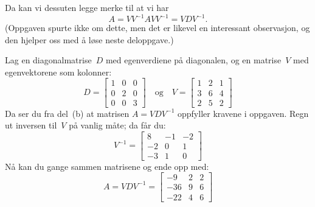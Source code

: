 \begin{losning}
\begin{punkt}
Da kan vi dessuten legge merke til at vi har
\[
A = V V^{-1} A V V^{-1} = V D V^{-1}.
\]
(Oppgaven spurte ikke om dette, men det er likevel en interessant
observasjon, og den hjelper oss med å løse neste deloppgave.)
\end{punkt}
\begin{punkt}
Lag en diagonalmatrise~$D$ med egenverdiene på diagonalen, og en
matrise~$V$ med egenvektorene som kolonner:
\[
D =
\begin{bmatrix}
1 & 0 & 0 \\
0 & 2 & 0 \\
0 & 0 & 3
\end{bmatrix}
\quad\text{og}\quad
V =
\begin{bmatrix}
1 & 2 & 1 \\
3 & 6 & 4 \\
2 & 5 & 2
\end{bmatrix}
\]
Da ser du fra del~(b) at matrisen $A = VDV^{-1}$ oppfyller kravene i
oppgaven.  Regn ut inversen til~$V$ på vanlig måte; da får du:
\[
V^{-1} =
\begin{bmatrix}
 8 & -1 & -2 \\
-2 &  0 &  1 \\
-3 &  1 &  0
\end{bmatrix}
\]
Nå kan du gange sammen matrisene og ende opp med:
\[
A = VDV^{-1} =
\begin{bmatrix}
 -9 & 2 & 2 \\
-36 & 9 & 6 \\
-22 & 4 & 6
\end{bmatrix}
\]
\end{punkt}
\end{losning}
